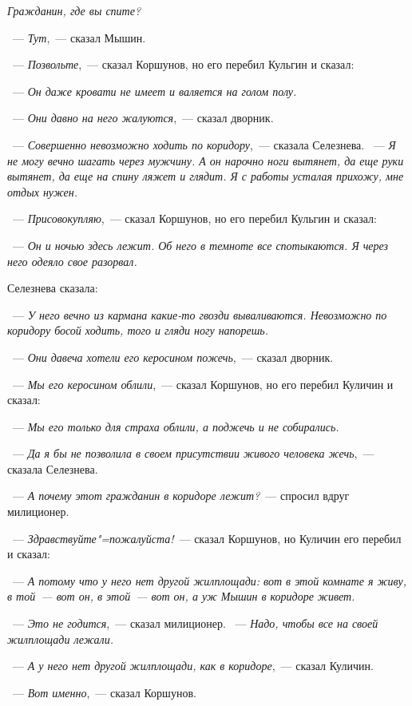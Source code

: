 \textit{Гражданин, где вы спите?}

~--- \textit{Тут},~--- сказал Мышин.

~--- \textit{Позвольте},~--- сказал Коршунов, но его перебил Кульгин и сказал:

~--- \textit{Он даже кровати не имеет и валяется на голом полу.}

~--- \textit{Они давно на него жалуются},~--- сказал дворник.

~--- \textit{Совершенно невозможно ходить по коридору},~--- сказала Селезнева. ~--- \textit{Я не могу вечно шагать через мужчину. А он нарочно ноги вытянет, да еще руки вытянет, да еще на спину ляжет и глядит. Я с работы усталая прихожу, мне отдых нужен.}

~--- \textit{Присовокупляю},~--- сказал Коршунов, но его перебил Кульгин и сказал:

~--- \textit{Он и ночью здесь лежит. Об него в темноте все спотыкаются. Я через него одеяло свое разорвал.}

Селезнева сказала:

~--- \textit{У него вечно из кармана какие-то гвозди вываливаются. Невозможно по коридору босой ходить, того и гляди ногу напорешь.}

~--- \textit{Они давеча хотели его керосином пожечь},~--- сказал дворник.

~--- \textit{Мы его керосином облили},~--- сказал Коршунов, но его перебил Куличин и сказал:

~--- \textit{Мы его только для страха облили, а поджечь и не собирались.}

~--- \textit{Да я бы не позволила в своем присутствии живого человека жечь},~--- сказала Селезнева.

~--- \textit{А почему этот гражданин в коридоре лежит?}~--- спросил вдруг милиционер.

~--- \textit{Здравствуйте"=пожалуйста!}~--- сказал Коршунов, но Куличин его перебил и сказал:

~--- \textit{А потому что у него нет другой жилплощади: вот в этой комнате я живу, в той~--- вот он, в этой~--- вот он, а уж Мышин в коридоре живет.}

~--- \textit{Это не годится},~--- сказал милиционер. ~--- \textit{Надо, чтобы все на своей жилплощади лежали.}

~--- \textit{А у него нет другой жилплощади, как в коридоре},~--- сказал Куличин.

~--- \textit{Вот именно},~--- сказал Коршунов.

